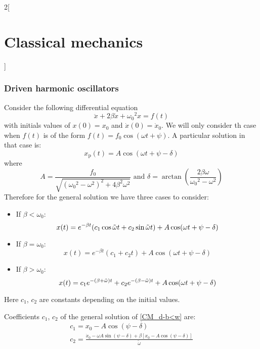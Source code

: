 \documentclass[../../../main_physics.tex]{subfiles}
\begin{document}
\begin{multicols}{2}[\section{Classical mechanics}]
  \subsubsection{Driven harmonic oscillators}
  \begin{proposition}
    Consider the following differential equation $$\ddot{x}+2\beta\dot{x}+{\omega_0}^2 x=f(t)$$ with initials values of $x(0)=x_0$ and $\dot{x}(0)=\dot{x}_0$. We will only consider th case when $f(t)$ is of the form $f(t)=f_0\cos(\omega t+\psi)$. A particular solution in that case is:
    $$x_\text{p}(t)=A\cos(\omega t+\psi-\delta)$$
    where $$A=\frac{f_0}{\sqrt{{({\omega_0}^2-\omega^2)}^2+4\beta^2\omega^2}}\text{ and }\delta=\arctan\left({\frac{2\beta\omega}{{\omega_0}^2-\omega^2}}\right)$$ Therefore for the general solution we have three cases to consider:
    \begin{itemize}
      \item If $\beta<\omega_0$:
            \begin{equation}
              x(t)=e^{-\beta t}(c_1\cos\Tilde{\omega}t+c_2\sin\Tilde{\omega}t)+A\cos(\omega t+\psi-\delta)
              \label{CM_d-b<w}
            \end{equation}
      \item If $\beta=\omega_0$:
            \begin{equation}
              x(t)=e^{-\beta t}\left(c_1+c_2t\right)+A\cos(\omega t+\psi-\delta)
              \label{CM_d-b=w}
            \end{equation}
      \item If $\beta>\omega_0$:
            \begin{equation}
              x(t)=c_1e^{-(\beta+\Tilde{\omega})t}+c_2e^{-(\beta-\Tilde{\omega})t}+A\cos(\omega t+\psi-\delta)
              \label{CM_d-b>w}
            \end{equation}
    \end{itemize}
    Here $c_1$, $c_2$ are constants depending on the initial values.
  \end{proposition}
  \begin{proposition}
    Coefficients $c_1$, $c_2$ of the general solution of \cref{CM_d-b<w} are:
    \begin{gather*}
      c_1=x_0-A\cos\left(\psi-\delta\right)\\
      c_2=\frac{\dot{x}_0-\omega A\sin\left(\psi-\delta\right)+\beta\left[x_0-A\cos\left(\psi-\delta\right)\right]}{\tilde{\omega}}
    \end{gather*}

\end{proposition}
\end{multicols}
\end{document}
